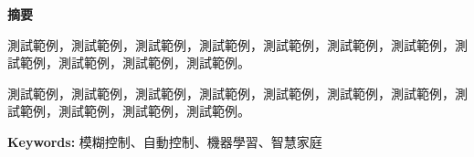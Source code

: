 \begin{center}
	\LARGE {\textbf{摘要}}
\end{center}

\bigskip  %
測試範例，測試範例，測試範例，測試範例，測試範例，測試範例，測試範例，測試範例，測試範例，測試範例，測試範例。

\bigskip  %
測試範例，測試範例，測試範例，測試範例，測試範例，測試範例，測試範例，測試範例，測試範例，測試範例，測試範例。

\vspace{3em}
\noindent %
\textbf{Keywords:} 模糊控制、自動控制、機器學習、智慧家庭